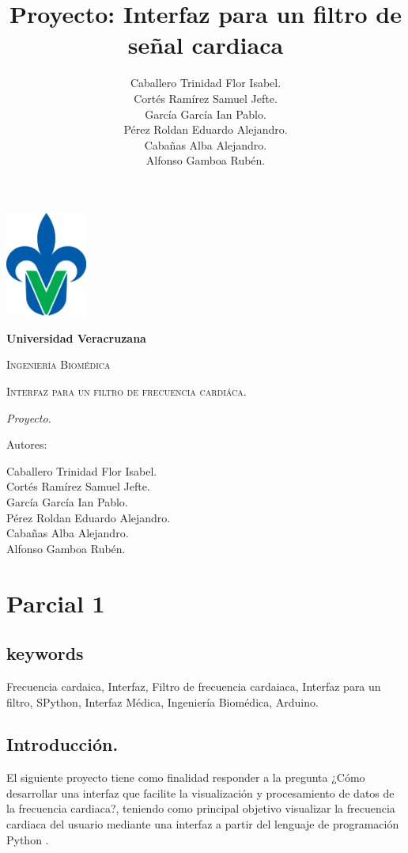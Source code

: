 \documentclass{report}
\title{Proyecto: Interfaz para un filtro de señal cardiaca}
\author{Caballero Trinidad Flor Isabel. \\ Cortés Ramírez Samuel Jefte. \\ García García Ian Pablo. \\ Pérez Roldan Eduardo Alejandro. \\ Cabañas Alba Alejandro. \\ Alfonso Gamboa Rubén.}
\begin{document}
\begin{titlepage}
	\centering
	{\includegraphics[width=0.2\textwidth]{recursos/Universidad_Veracruzana}\par}
	\vspace{1cm}
	{\bfseries\LARGE Universidad Veracruzana \par}
	\vspace{1cm}
	{\scshape\Large Ingeniería Biomédica \par}
	\vspace{3cm}
	{\scshape\Huge Interfaz para un filtro de frecuencia cardiáca. \par}
	\vspace{2cm}
	{\itshape\Large Proyecto. \par}
	\vfill
	{\Large Autores: \par}
	{\Large Caballero Trinidad Flor Isabel. \\ Cortés Ramírez Samuel Jefte. \\ García García Ian Pablo. \\ Pérez Roldan Eduardo Alejandro. \\ Cabañas Alba Alejandro. \\ Alfonso Gamboa Rubén. \par}
	\vfill
	
\end{titlepage}

\chapter{Parcial 1}
	\section{keywords}
	Frecuencia cardaica, Interfaz, Filtro de frecuencia cardaiaca, Interfaz para un filtro, SPython, Interfaz Médica, Ingeniería Biomédica, Arduino.
	
	\section{Introducción.}
		El siguiente proyecto tiene como finalidad responder a la pregunta ¿Cómo desarrollar una interfaz que facilite la visualización y procesamiento de datos de la frecuencia cardiaca?, teniendo como principal objetivo visualizar la frecuencia cardiaca del usuario mediante una interfaz a partir del lenguaje de programación Python \cite{python3}. 
		
\end{document}
